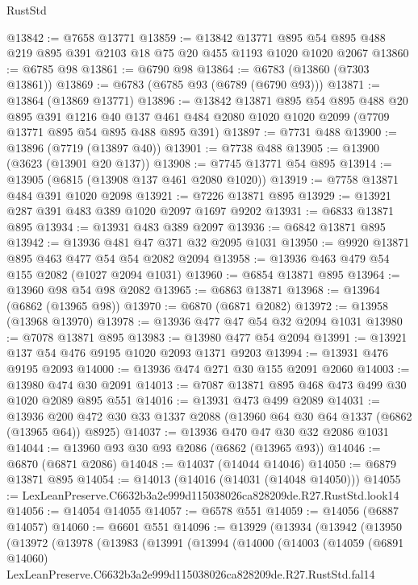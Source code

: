 \begin{lexlean}{RustStd}
\begin{coremodule}
@13842 := @7658 @13771
@13859 := @13842
    @13771
    @895
    @54
    @895
    @488
    @219
    @895
    @391
    @2103
    @18
    @75
    @20
    @455
    @1193
    @1020
    @1020
    @2067
@13860 := @6785 @98
@13861 := @6790 @98
@13864 := @6783 (@13860 (@7303 @13861))
@13869 := @6783 (@6785 @93 (@6789 (@6790 @93)))
@13871 := @13864 (@13869 @13771)
@13896 := @13842
    @13871
    @895
    @54
    @895
    @488
    @20
    @895
    @391
    @1216
    @40
    @137
    @461
    @484
    @2080
    @1020
    @1020
    @2099
    (@7709 @13771 @895 @54 @895 @488 @895 @391)
@13897 := @7731 @488
@13900 := @13896 (@7719 (@13897 @40))
@13901 := @7738 @488
@13905 := @13900 (@3623 (@13901 @20 @137))
@13908 := @7745 @13771 @54 @895
@13914 := @13905 (@6815 (@13908 @137 @461 @2080 @1020))
@13919 := @7758 @13871 @484 @391 @1020 @2098
@13921 := @7226 @13871 @895
@13929 := @13921 @287 @391 @483 @389 @1020 @2097 @1697 @9202
@13931 := @6833 @13871 @895
@13934 := @13931 @483 @389 @2097
@13936 := @6842 @13871 @895
@13942 := @13936 @481 @47 @371 @32 @2095 @1031
@13950 := @9920 @13871 @895 @463 @477 @54 @54 @2082 @2094
@13958 := @13936 @463 @479 @54 @155 @2082 (@1027 @2094 @1031)
@13960 := @6854 @13871 @895
@13964 := @13960 @98 @54 @98 @2082
@13965 := @6863 @13871
@13968 := @13964 (@6862 (@13965 @98))
@13970 := @6870 (@6871 @2082)
@13972 := @13958 (@13968 @13970)
@13978 := @13936 @477 @47 @54 @32 @2094 @1031
@13980 := @7078 @13871 @895
@13983 := @13980 @477 @54 @2094
@13991 := @13921 @137 @54 @476 @9195 @1020 @2093 @1371 @9203
@13994 := @13931 @476 @9195 @2093
@14000 := @13936 @474 @271 @30 @155 @2091 @2060
@14003 := @13980 @474 @30 @2091
@14013 := @7087 @13871 @895 @468 @473 @499 @30 @1020 @2089 @895 @551
@14016 := @13931 @473 @499 @2089
@14031 := @13936 @200 @472 @30 @33 @1337 @2088 (@13960 @64 @30 @64 @1337 (@6862 (@13965 @64)) @8925)
@14037 := @13936 @470 @47 @30 @32 @2086 @1031
@14044 := @13960 @93 @30 @93 @2086 (@6862 (@13965 @93))
@14046 := @6870 (@6871 @2086)
@14048 := @14037 (@14044 @14046)
@14050 := @6879 @13871 @895
@14054 := @14013 (@14016 (@14031 (@14048 @14050)))
@14055 := LexLeanPreserve.C6632b3a2e999d115038026ca828209de.R27.RustStd.look14
@14056 := @14054 @14055
@14057 := @6578 @551
@14059 := @14056 (@6887 @14057)
@14060 := @6601 @551
@14096 := @13929
    (@13934
      (@13942
        (@13950
          (@13972
            (@13978
              (@13983
                (@13991
                  (@13994
                    (@14000
                      (@14003
                        (@14059
                          (@6891 @14060)
                          LexLeanPreserve.C6632b3a2e999d115038026ca828209de.R27.RustStd.fal14

\end{coremodule}
\end{lexlean}
